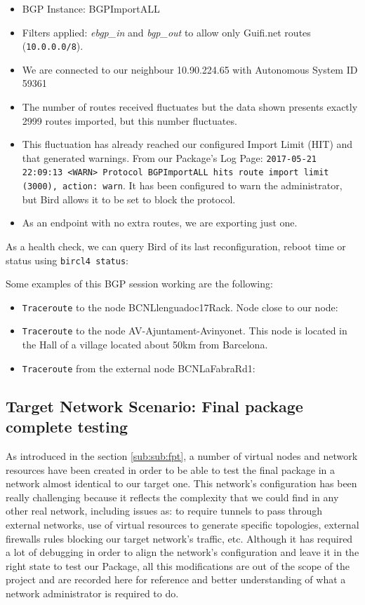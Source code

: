 \begin{itemize}
    \item BGP Instance: BGPImportALL
    \item Filters applied: \textit{ebgp\_in} and \textit{bgp\_out} to allow only Guifi.net routes (\texttt{10.0.0.0/8}).
    \item We are connected to our neighbour 10.90.224.65 with Autonomous System ID 59361
    \item  The number of routes received fluctuates but the data shown presents exactly 2999 routes imported, but this number fluctuates.
    \item This fluctuation has already reached our configured Import Limit (HIT) and that generated warnings.
    From our Package's Log Page:
    \texttt{2017-05-21 22:09:13 <WARN> Protocol BGPImportALL hits route import limit (3000), action: warn}. It has been configured to warn the administrator, but Bird allows it to be set to block the protocol.
    \item As an endpoint with no extra routes, we are exporting just one.
\end{itemize}

As a health check, we can query Bird of its last reconfiguration, reboot time or status using \texttt{bircl4 status}:



Some examples of this BGP session working are the following:

\begin{itemize}
    \item \texttt{Traceroute} to the node BCNLlenguadoc17Rack. Node close to our node:

    \item \texttt{Traceroute} to the node AV-Ajuntament-Avinyonet. This node is located in the Hall of a village located about 50km from Barcelona.

    \item \texttt{Traceroute} from the external node BCNLaFabraRd1:

\end{itemize}

\newpage
\subsection{Target Network Scenario: Final package complete testing}
\label{sub:fulltest}
As introduced in the section \ref{sub:sub:fpt}, a number of virtual nodes and network resources have been created in order to be able to test the final package in a network almost identical to our target one. This network's configuration has been really challenging because it reflects the complexity that we could find in any other real network, including issues as: to require tunnels to pass through external networks, use of virtual resources to generate specific topologies, external firewalls rules blocking our target network's traffic, etc. Although it has required a lot of debugging in order to align the network's configuration and leave it in the right state to test our Package, all this modifications are out of the scope of the project and are recorded here for reference and better understanding of what a network administrator is required to do.

